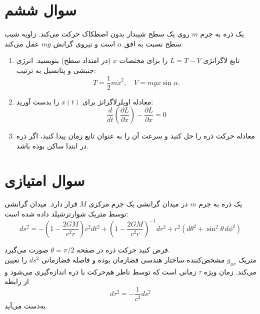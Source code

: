 \documentclass[a4paper,16pt]{article}
\begin{document}
	\section{سوال ششم}
	
	یک ذره به جرم \(m\) روی یک سطح شیبدار بدون اصطکاک حرکت می‌کند. زاویه شیب سطح نسبت به افق \(\alpha\) است و نیروی گرانش \(mg\) عمل می‌کند.
	
	\begin{enumerate}
		\item تابع لاگرانژی \(L = T - V\) را برای مختصات \(x\) (در امتداد سطح) بنویسید. انرژی جنبشی و پتانسیل به ترتیب:
		\[
		T = \frac{1}{2} m \dot{x}^2, \quad V = mg x \sin\alpha.
		\]
		
		\item معادله اویلرلاگرانژ برای \(x(t)\) را بدست آورید:
		\[
		\frac{d}{dt} \left( \frac{\partial L}{\partial \dot{x}} \right) - \frac{\partial L}{\partial x} = 0
		\]
		
		\item معادله حرکت ذره را حل کنید و سرعت آن را به عنوان تابع زمان پیدا کنید، اگر ذره در ابتدا ساکن بوده باشد.
	\end{enumerate}
	\section{سوال امتیازی}
	
	یک ذره به جرم \(m\) در میدان گرانشی یک جرم مرکزی \(M\) قرار دارد. میدان گرانشی توسط متریک شوارتزشیلد داده شده است:
	\[
	ds^2 = -\left(1-\frac{2GM}{c^2 r}\right)c^2 dt^2 + \left(1-\frac{2GM}{c^2 r}\right)^{-1} dr^2 + r^2 (d\theta^2 + \sin^2\theta\, d\phi^2)
	\]
	
	فرض کنید حرکت ذره در صفحه \(\theta = \pi/2\) صورت می‌گیرد.
	\\
	
	\noindent
	متریک $g_{\mu\nu}$ مشخص‌کننده ساختار هندسی فضازمان بوده و فاصله فضازمانی $ds^2$ را تعیین می‌کند.
	زمان ویژه $\tau$ زمانی است که توسط ناظر هم‌حرکت با ذره اندازه‌گیری می‌شود و از رابطه
	\[
	d\tau^2 = -\frac{1}{c^2} ds^2
	\]
	به‌دست می‌آید.
	\vspace{10pt}
	
\end{document}

